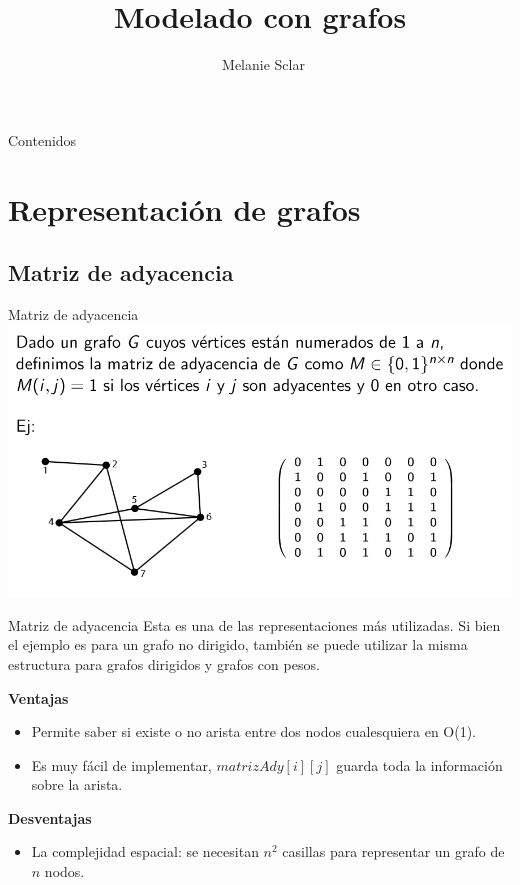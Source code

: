 \documentclass[compress]{beamer}
\title[Modelado con grafos] %
{Modelado con grafos}
\author[Melanie Sclar] %
{~Melanie Sclar}
\institute[UBA] %
{
  Facultad de Ciencias Exactas y Naturales\\
  Universidad de Buenos Aires
}
\newcommand{\bigpause}{\bigskip \pause}
\begin{document}
\begin{frame}
  \titlepage
\end{frame}

\begin{frame}{Contenidos}
  \tableofcontents
\end{frame}


\section{Representaci\'on de grafos}
\subsection{Matriz de adyacencia}
\begin{frame}{Matriz de adyacencia}
\includegraphics[scale=0.5]{matriz-adyacencia.png}
\end{frame}

\begin{frame}{Matriz de adyacencia}
Esta es una de las representaciones m\'as utilizadas. Si bien el ejemplo es para un grafo no dirigido, tambi\'en se puede utilizar la misma estructura para grafos dirigidos y grafos con pesos.
\bigskip

{\bf Ventajas}
\pause
{} {
	\begin{itemize}
		\item Permite saber si existe o no arista entre dos nodos cualesquiera en O(1).
		\item Es muy f\'acil de implementar, $matrizAdy[i][j]$ guarda toda la informaci\'on sobre la arista.
	\end{itemize}
}
\bigpause
{\bf Desventajas}
\pause
{} {
	\begin{itemize}
		\item La complejidad espacial: se necesitan $n^2$ casillas para representar un grafo de $n$ nodos.
	\end{itemize}
}
\end{frame}
\end{document}
